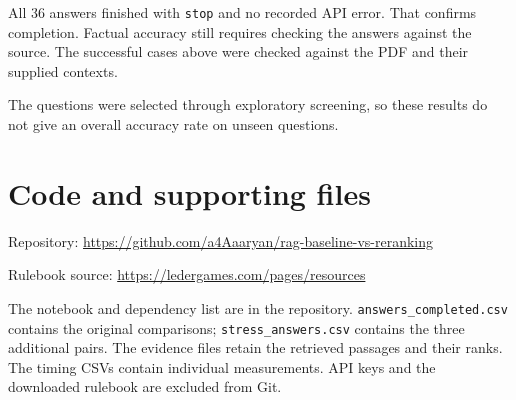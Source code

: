 \documentclass[11pt,a4paper]{article}
\begin{document}
All 36 answers finished with \texttt{stop} and no recorded API error.
That confirms completion. Factual accuracy still requires checking the
answers against the source. The successful cases above were checked
against the PDF and their supplied contexts.

The questions were selected through exploratory screening, so these
results do not give an overall accuracy rate on unseen questions.

\section*{Code and supporting files}

Repository: \url{https://github.com/a4Aaaryan/rag-baseline-vs-reranking}

Rulebook source: \url{https://ledergames.com/pages/resources}

The notebook and dependency list are in the repository.
\texttt{answers\_completed.csv} contains the original comparisons;
\texttt{stress\_answers.csv} contains the three additional pairs.
The evidence files retain the retrieved passages and their ranks.
The timing CSVs contain individual measurements. API keys and the
downloaded rulebook are excluded from Git.
\end{document}
